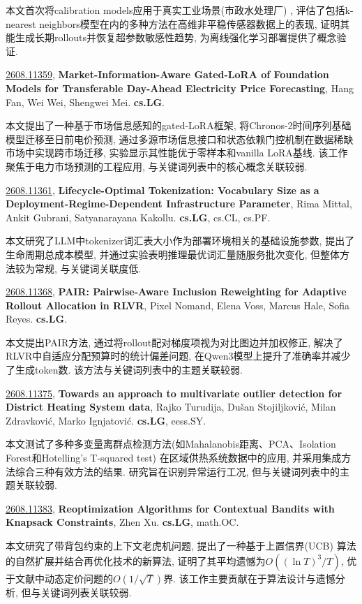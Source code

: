 \documentclass[9pt, a4paper]{article}
\theoremstyle{plain}
\theoremstyle{definition}
\theoremstyle{remark}
\newcommand{\arxivwithtarget}[3]{\hypertarget{#1}{}\href{https://arxiv.org/abs/#1}{#1}, \textbf{\textcolor{arxivblue}{#2}}, #3. }
\begin{document}
本文首次将calibration models应用于真实工业场景(市政水处理厂) , 评估了包括k-nearest neighbors模型在内的多种方法在高维非平稳传感器数据上的表现, 证明其能生成长期rollouts并恢复超参数敏感性趋势, 为离线强化学习部署提供了概念验证.


\arxivwithtarget{2608.11359}{Market-Information-Aware Gated-LoRA of Foundation Models for Transferable Day-Ahead Electricity Price Forecasting}{Hang Fan, Wei Wei, Shengwei Mei}\textbf{cs.LG}.

本文提出了一种基于市场信息感知的gated-LoRA框架, 将Chronos-2时间序列基础模型迁移至日前电价预测, 通过多源市场信息接口和状态依赖门控机制在数据稀缺市场中实现跨市场迁移, 实验显示其性能优于零样本和vanilla LoRA基线. 该工作聚焦于电力市场预测的工程应用, 与关键词列表中的核心概念关联较弱.


\arxivwithtarget{2608.11361}{Lifecycle-Optimal Tokenization: Vocabulary Size as a Deployment-Regime-Dependent Infrastructure Parameter}{Rima Mittal, Ankit Gubrani, Satyanarayana Kakollu}\textbf{cs.LG}, cs.CL, cs.PF.

本文研究了LLM中tokenizer词汇表大小作为部署环境相关的基础设施参数, 提出了生命周期总成本模型, 并通过实验表明推理最优词汇量随服务批次变化, 但整体方法较为常规, 与关键词关联度低.


\arxivwithtarget{2608.11368}{PAIR: Pairwise-Aware Inclusion Reweighting for Adaptive Rollout Allocation in RLVR}{Pixel Nomand, Elena Voss, Marcus Hale, Sofia Reyes}\textbf{cs.LG}.

本文提出PAIR方法, 通过将rollout配对梯度项视为对比图边并加权修正, 解决了RLVR中自适应分配预算时的统计偏差问题, 在Qwen3模型上提升了准确率并减少了生成token数. 该方法与关键词列表中的主题关联较弱.


\arxivwithtarget{2608.11375}{Towards an approach to multivariate outlier detection for District Heating System data}{Rajko Turudija, Dušan Stojiljković, Milan Zdravković, Marko Ignjatović}\textbf{cs.LG}, eess.SY.

本文测试了多种多变量离群点检测方法(如Mahalanobis距离、PCA、Isolation Forest和Hotelling's T-squared test) 在区域供热系统数据中的应用, 并采用集成方法综合三种有效方法的结果. 研究旨在识别异常运行工况, 但与关键词列表中的主题关联较弱.


\arxivwithtarget{2608.11383}{Reoptimization Algorithms for Contextual Bandits with Knapsack Constraints}{Zhen Xu}\textbf{cs.LG}, math.OC.

本文研究了带背包约束的上下文老虎机问题, 提出了一种基于上置信界(UCB) 算法的自然扩展并结合再优化技术的新算法, 证明了其平均遗憾为$O((\ln T)^3/T)$, 优于文献中动态定价问题的$O(1/\sqrt{T})$界. 该工作主要贡献在于算法设计与遗憾分析, 但与关键词列表关联较弱.
\end{document}
